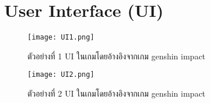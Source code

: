 \section{User Interface (UI)}


\begin{figure}[htbp]
  \centering 
  \texttt{[image: UI1.png]}
  \caption[UI example1]{ตัวอย่างที่ 1 UI ในเกมโดยอ้างอิงจากเกม genshin impact}
  \label{fig:UI1}
\end{figure}

\begin{figure}[htbp]
  \centering 
  \texttt{[image: UI2.png]}
  \caption[UI example2]{ตัวอย่างที่ 2 UI ในเกมโดยอ้างอิงจากเกม genshin impact}
  \label{fig:UI2}
\end{figure}


